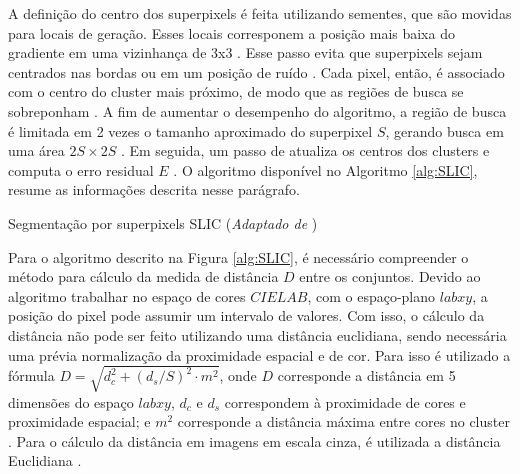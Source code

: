 \begin{document}
A definição do centro dos superpixels é feita utilizando sementes, que são movidas para locais de geração. Esses locais corresponem a posição mais baixa do gradiente em uma vizinhança de 3x3 \cite{SLIC}. Esse passo evita que superpixels sejam centrados nas bordas ou em um posição de ruído \cite{SLIC}. Cada pixel, então, é associado com o centro do cluster mais próximo, de modo que as regiões de busca se sobreponham \cite{SLIC}. A fim de aumentar o desempenho do algoritmo, a região de busca é limitada em 2 vezes o tamanho aproximado do superpixel $S$, gerando busca em uma área $2S \times 2S$ \cite{SLIC}. Em seguida, um passo de atualiza os centros dos clusters e computa o erro residual $E$ \cite{SLIC}. O algoritmo disponível no Algoritmo \ref{alg:SLIC}, resume as informações descrita nesse parágrafo.

\begin{algorithm}
    \caption{Segmentação por superpixels SLIC (\textit{Adaptado de } \cite{SLIC})}
    \label{alg:SLIC}
    \begin{algorithmic}[1]
        \Repeat
                \EndIf
                \EndFor
            \EndFor    
    \end{algorithmic}
\end{algorithm}


Para o algoritmo descrito na Figura \ref{alg:SLIC}, é necessário compreender o método para cálculo da medida de distância $D$ entre os conjuntos. Devido ao algoritmo trabalhar no espaço de cores $CIELAB$, com o espaço-plano $labxy$, a posição do pixel pode assumir um intervalo de valores. Com isso, o cálculo da distância não pode ser feito utilizando uma distância euclidiana, sendo necessária uma prévia normalização da proximidade espacial e de cor. Para isso é utilizado a fórmula $D=\sqrt{d_c^2+(d_s/S)^2 \cdot m^2}$, onde $D$ corresponde a distância em 5 dimensões do espaço $labxy$, $d_c$ e $d_s$ correspondem à proximidade de cores e proximidade espacial; e $m^2$ corresponde a distância máxima entre cores no cluster \cite{SLIC}. Para o cálculo da distância em imagens em escala cinza, é utilizada a distância Euclidiana \cite{SLIC}.
\end{document}
